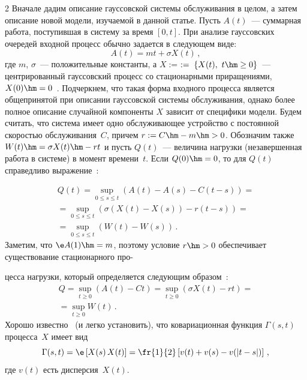 \begin{multicols}{2}
Вначале дадим  описание гауссовской системы обслуживания в целом, а
затем описание новой модели, изучаемой  в данной статье. Пусть
$A(t)$~--- суммарная работа, поступившая в систему за время $[0,t]$.
При анализе  гауссовских очередей  входной процесс обычно
задается в следующем виде:
\begin{equation}
A(t)=mt+\sigma X(t)\,, 
\label{asymp-l1}
\end{equation}
где  $m$, $\sigma $~--- положительные константы, а  $X:=$\linebreak $:=\;\{X(t),\ t\hm\geq 0\}$~---  
центрированный гауссовский процесс со стационарными
приращениями,  $X(0)\hm=0$~\cite{Mandjes}.
 Подчеркнем, что такая форма входного процесса  является
 общепринятой при описании гауссовской системы обслуживания, однако более полное описание случайной компоненты  $X$
 зависит от специфики  модели.  Будем считать, что система имеет одно обслуживающее устройство с постоянной
скоростью обслуживания~$C$, причем $r:=C\hm-m\hm>0$. Обозначим также
$W(t)\hm=\sigma X(t)\hm-rt$ и пусть
 $Q(t)$~--- величина нагрузки (незавершенная работа в системе) в момент времени~$t$. 
 Если $Q(0)\hm=0$, то для $Q(t)$ справедливо выражение~\cite{Reich}:
 
 \noindent
\begin{multline}
Q(t)= \sup\limits_{0 \leq s \leq t}(A(t)-A(s)-C(t-s))={}\\
{}= \sup\limits_{0 \leq s \leq t}(\sigma(X(t)-X(s))-r(t-s))={}\\
{}=\sup\limits_{0 \leq s \leq t}(W(t)-W(s))\,.
\label{e6a-ml}
\end{multline}
Заметим, что $ \e A(1)\hm=m$, поэтому  условие  $r\hm>0$ обеспечивает
существование стационарного про-\linebreak\vspace*{-12pt}

\pagebreak

\noindent
цесса нагрузки,  который определяется
следующим образом~\cite{Mandjes}:
\begin{multline}
Q= \sup\limits_{t \geq 0} \left( A(t)-Ct \right)= \sup\limits_{t \geq 0} \left( \sigma X(t)-rt \right)={}\\
{}= \sup\limits_{t \geq 0} W(t)\,.
\label{e6-ml}
\end{multline}
Хорошо известно~\cite{Mandjes} (и легко установить), что
ковариационная функция $\Gamma(s,t)$ процесса~$X$ имеет вид
\begin{equation*}
\Gamma(s,t)=\e\left [X(s)\,X(t)\right]=\fr{1}{2}\left[
v(t)+v(s)-v(|t-s|) \right]\,,
\end{equation*}
где $v(t)$ есть дисперсия~$X(t)$.


\end{multicols}
